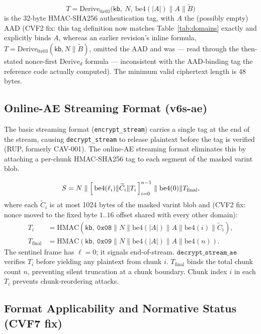 \documentclass[11pt,a4paper]{article}
\begin{document}
\[
  T = \mathrm{Derive}_{0x03}\bigl(\mathsf{kb},\ N,\ \mathrm{be4}(|A|) \| A \| \widetilde{B}\bigr)
\]
is the 32-byte HMAC-SHA256 authentication tag, with $A$ the (possibly empty)
AAD (CVF2 fix: this tag definition now matches Table~\ref{tab:domains}
exactly and explicitly binds $A$, whereas an earlier revision's inline
formula, $T = \mathrm{Derive}_{0x03}(\mathsf{kb}, N \| \widetilde{B})$, omitted
the AAD and was — read through the then-stated nonce-first
$\mathrm{Derive}_d$ formula — inconsistent with the AAD-binding tag the
reference code actually computed). The minimum valid ciphertext length is
48 bytes.

\subsection{Online-AE Streaming Format (v6s-ae)}
\label{sec:streaming-ae}

The basic streaming format (\texttt{encrypt\_stream}) carries a single tag at the
end of the stream, causing \texttt{decrypt\_stream} to release plaintext before
the tag is verified (RUP, formerly CAV-001).  The online-AE streaming format
eliminates this by attaching a per-chunk HMAC-SHA256 tag to each segment of the
masked varint blob.

\[
  S = N \;\|\; \Bigl[\,\mathrm{be4}(\ell_i) \| \widetilde{C}_i \| T_i\,\Bigr]_{i=0}^{n-1} \;\|\; \mathrm{be4}(0) \| T_{\mathrm{final}},
\]
where each $\widetilde{C}_i$ is at most 1024 bytes of the masked varint blob and (CVF2
fix: nonce moved to the fixed byte $1..16$ offset shared with every other domain):
\begin{align*}
  T_i &= \mathrm{HMAC}\!\left(\mathsf{kb},\ \texttt{0x08}
          \| N \| \mathrm{be4}(|A|) \| A \| \mathrm{be4}(i) \| \widetilde{C}_i\right), \\
  T_{\mathrm{final}} &= \mathrm{HMAC}\!\left(\mathsf{kb},\ \texttt{0x09}
          \| N \| \mathrm{be4}(|A|) \| A \| \mathrm{be4}(n)\right).
\end{align*}
The sentinel frame has $\ell = 0$; it signals end-of-stream.
$\texttt{decrypt\_stream\_ae}$ verifies $T_i$ before yielding any plaintext from chunk $i$.
$T_{\mathrm{final}}$ binds the total chunk count $n$, preventing silent truncation at a
chunk boundary.  Chunk index $i$ in each $T_i$ prevents chunk-reordering attacks.

\subsection{Format Applicability and Normative Status (CVF7 fix)}
\label{sec:format-applicability}
\end{document}
